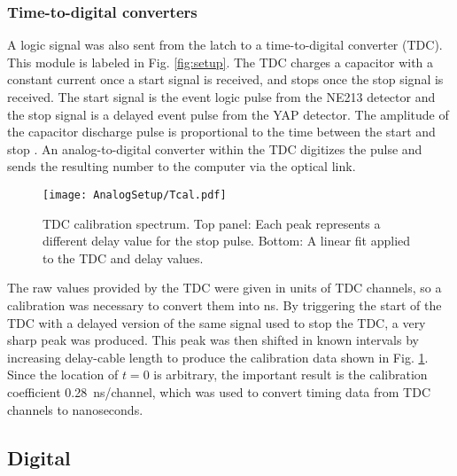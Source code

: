 \documentclass[main.tex]{subfiles}
\begin{document}
\subsubsection{Time-to-digital converters}
A logic signal was also sent from the latch to a time-to-digital converter (TDC). This module is labeled  in Fig. \ref{fig:setup}. The TDC charges a capacitor with a constant current once a start signal is received, and stops once the stop signal is received. The start signal is the event logic pulse from the NE213 detector and the stop signal is a delayed event pulse from the YAP detector. The amplitude of the capacitor discharge pulse is proportional to the time between the start and stop \cite{CAENTDC}. An analog-to-digital converter within the TDC digitizes the pulse and sends the resulting number to the computer via the optical link.
\begin{figure}[h]
	\centering
    	\texttt{[image: AnalogSetup/Tcal.pdf]}
        \caption[TDC calibration spectrum.]{TDC calibration spectrum. Top panel: Each peak represents a different delay value for the stop pulse. Bottom: A linear fit applied to the TDC and delay values.}
	    \label{fig:Tcal} 
\end{figure}

The raw values provided by the TDC were given in units of TDC channels, so a calibration was necessary to convert them into ns. By triggering the start of the TDC with a delayed version of the same signal used to stop the TDC, a very sharp peak was produced. This peak was then shifted in known intervals by increasing delay-cable length to produce the calibration data shown in Fig. \ref{fig:Tcal}. Since the location of $t=0$ is arbitrary, the important result is the calibration coefficient \SI{0.28}{\nano\second/channel}, which was used to convert timing data from TDC channels to nanoseconds.


\subsection{Digital}
\end{document}
